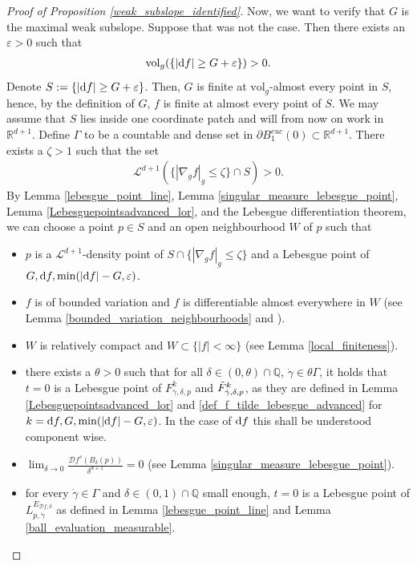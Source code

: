 \documentclass[a4paper,10pt]{article}
\numberwithin{equation}{section}
\newcommand{\R}{\mathbb{R}}
\newcommand{\Q}{\mathbb{Q}}
\newcommand{\e}{\varepsilon}
\newcommand{\vol}{\mathrm{vol}}
\newcommand{\di}{{\rm d}}
\begin{document}
\begin{proof}[Proof of Proposition \ref{weak_subslope_identified}]
     Now, we want to verify that $G$ is the maximal weak subslope. Suppose that was not the case. Then there exists an $\e > 0$ such that 
     \begin{align*}
         \vol_g(\{|\di f| \geq G+\e\}) >0.
     \end{align*}
     Denote $S:= \{|\di f| \geq G+\e\}$. Then, $G$ is finite at $\vol_g$-almost every point in $S$, hence, by the definition of $G$, $f$ is finite at almost every point of $S$.
     We may assume that $S$ lies inside one coordinate patch and will from now on work in $\R^{d+1}$.     
     Define $\Gamma$ to be a countable and dense set in $\partial B_1^{euc}(0) \subset \R^{d+1}$.
     There exists a $\zeta>1$ such that the set
     \begin{align}\label{bounded_gradient_domain}
         \mathcal{L}^{d+1}(\{|\nabla_g f|_g \leq \zeta\}\cap S)>0. 
     \end{align}
    By Lemma \ref{lebesgue_point_line}, Lemma \ref{singular_measure_lebesgue_point}, Lemma \ref{Lebesguepointsadvanced_lor}, and the Lebesgue differentiation theorem, we can choose a point $p \in S$ and an open neighbourhood $W$ of $p$ such that 
    \begin{itemize}
        \item $p$ is a $\mathcal{L}^{d+1}$-density point of $S \cap \{|\nabla_g f|_g \leq \zeta\}$ and a Lebesgue point of $G, \di f, \min(|\di f|-G, \e)$.
        \item  $f$ is of bounded variation and $f$ is differentiable almost everywhere in $W$ (see Lemma \ref{bounded_variation_neighbourhoods} and \cite{ambrosio2000functions}).
        \item $W$ is relatively compact and $W \subset \{|f|< \infty\}$ (see Lemma \ref{local_finiteness}).
        \item there exists a $\theta>0$ such that for all $\delta\in (0, \theta)\cap \Q$, $\dot{\gamma} \in \theta \Gamma$, it holds that $t=0$ is a Lebesgue point of $F^k_{\dot{\gamma}, \delta, p}$ and $\Tilde{F}^k_{\dot{\gamma}, \delta, p}$, as they are defined in Lemma \ref{Lebesguepointsadvanced_lor} and \eqref{def_f_tilde_lebesgue_advanced} for $k = \di f, G, \min(|\di f|-G, \e)$. In the case of $\di f$ this shall be understood component wise.
        \item $\lim_{\delta\to 0} \frac{\mathcal{D}f^s(B_\delta(p))}{\delta^{d+1}} =0$ (see Lemma \ref{singular_measure_lebesgue_point}). 
        \item for every $\dot{\gamma} \in \Gamma$ and $ \delta \in (0,1)\cap \Q$ small enough, $t=0$ is a Lebesgue point of $L^{E_{\mathcal{D}f, \delta}}_{p,\dot{\gamma}}$ as defined in Lemma \ref{lebesgue_point_line} and Lemma \ref{ball_evaluation_measurable}.

\end{itemize}
\end{proof}
\end{document}
